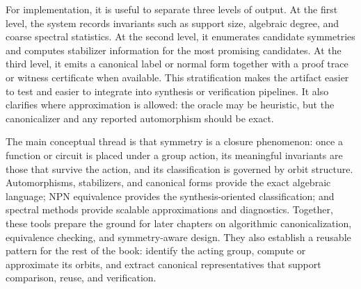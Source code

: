 For implementation, it is useful to separate three levels of output. At the first level, the system records invariants such as support size, algebraic degree, and coarse spectral statistics. At the second level, it enumerates candidate symmetries and computes stabilizer information for the most promising candidates. At the third level, it emits a canonical label or normal form together with a proof trace or witness certificate when available. This stratification makes the artifact easier to test and easier to integrate into synthesis or verification pipelines. It also clarifies where approximation is allowed: the oracle may be heuristic, but the canonicalizer and any reported automorphism should be exact.

The main conceptual thread is that symmetry is a closure phenomenon: once a function or circuit is placed under a group action, its meaningful invariants are those that survive the action, and its classification is governed by orbit structure. Automorphisms, stabilizers, and canonical forms provide the exact algebraic language; NPN equivalence provides the synthesis-oriented classification; and spectral methods provide scalable approximations and diagnostics. Together, these tools prepare the ground for later chapters on algorithmic canonicalization, equivalence checking, and symmetry-aware design. They also establish a reusable pattern for the rest of the book: identify the acting group, compute or approximate its orbits, and extract canonical representatives that support comparison, reuse, and verification.

